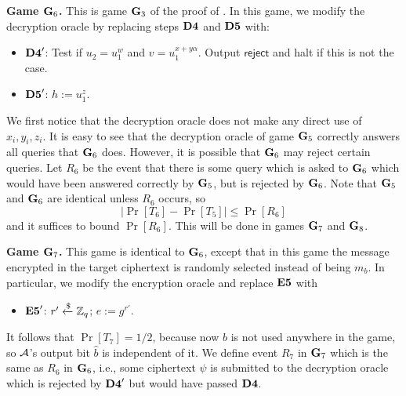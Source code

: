 \textbf{Game $\mathbf{G}_6$.} This is game $\mathbf{G}_3$ of the proof of \cite{cs01}. In this game, we modify the decryption oracle by replacing steps $\mathbf{D4}$ and $\mathbf{D5}$ with:
\begin{itemize}
	\item[]$\mathbf{D4}'$: Test if $u_2 = u_1^w$ and $v = u_1^{x+y\alpha}$. Output $\mathsf{reject}$ and halt if this is not the case.
	\item[]$\mathbf{D5}'$: $h:= u_1^z$.
\end{itemize}
We first notice that the decryption oracle does not make any direct use of $x_i, y_i, z_i$. It is easy to see that the decryption oracle of game $\mathbf{G}_5$ correctly answers all queries that $\mathbf{G}_6$ does. However, it is possible that $\mathbf{G}_6$ may reject certain queries. Let $R_6$ be the event that there is some query which is asked to $\mathbf{G}_6$ which would have been answered correctly by $\mathbf{G}_5$, but is rejected by $\mathbf{G}_6$. Note that $\mathbf{G}_5$ and $\mathbf{G}_6$ are identical unless $R_6$ occurs, so $$|\Pr[T_6]-\Pr[T_5]|\leq\Pr[R_6]$$ and it suffices to bound $\Pr[R_6]$. This will be done in games $\mathbf{G}_7$ and $\mathbf{G}_8$.

%
%

\textbf{Game $\mathbf{G}_7$.} This game is identical to $\mathbf{G}_6$, except that in this game the message encrypted in the target ciphertext is randomly selected instead of being $m_b$. In particular, we modify the encryption oracle and replace $\mathbf{E5}$ with
\begin{itemize}
	\item[]$\mathbf{E5}'$: $r'\xleftarrow{\$}\mathbb{Z}_q$; $e := g^{r'}$.
\end{itemize}
It follows that $\Pr[T_7] = 1/2$, because now $b$ is not used anywhere in the game, so $\mathcal{A}$'s output bit $\hat{b}$ is independent of it. We define event $R_7$ in $\mathbf{G}_7$ which is the same as $R_6$ in $\mathbf{G}_6$, i.e., some ciphertext $\psi$ is submitted to the decryption oracle which is rejected by $\mathbf{D4}'$ but would have passed $\mathbf{D4}$.

